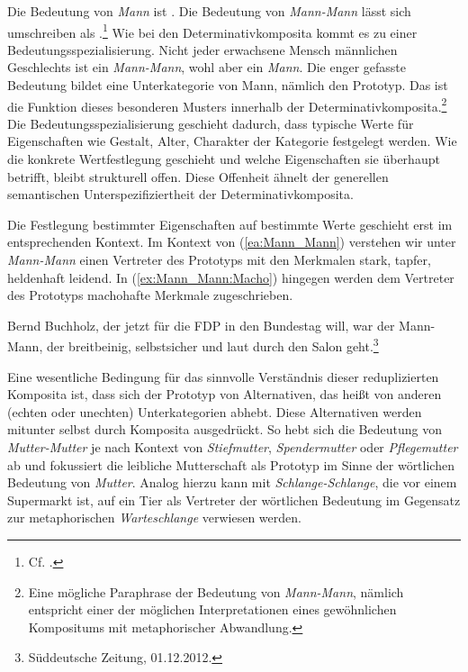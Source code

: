 Die Bedeutung von \textit{Mann} ist . Die Bedeutung von \textit{Mann-Mann} lässt sich umschreiben als .\footnote{Cf. \citet[312--314]{Hohenhaus2004}.} Wie bei den Determinativkomposita kommt es zu einer Bedeutungsspezialisierung. Nicht jeder erwachsene Mensch männlichen Geschlechts ist ein \textit{Mann-Mann}, wohl aber ein \textit{Mann}. Die enger gefasste Bedeutung bildet eine Unterkategorie von Mann, nämlich den Prototyp. Das ist die Funktion dieses besonderen Musters innerhalb der Determinativkomposita.\footnote{Eine mögliche Paraphrase der Bedeutung von \textit{Mann-Mann}, nämlich  entspricht einer der möglichen Interpretationen eines gewöhnlichen Kompositums mit metaphorischer Abwandlung.} Die Bedeutungsspezialisierung geschieht dadurch, dass typische Werte für Eigenschaften wie Gestalt, Alter, Charakter der Kategorie  festgelegt werden. Wie die konkrete Wertfestlegung geschieht und welche Eigenschaften sie überhaupt betrifft, bleibt strukturell offen. Diese Offenheit ähnelt der generellen semantischen Unterspezifiziertheit der Determinativkomposita.

Die Festlegung bestimmter Eigenschaften auf bestimmte Werte geschieht erst im entsprechenden Kontext. Im Kontext von (\ref{ea:Mann_Mann}) verstehen wir unter \textit{Mann-Mann} einen Vertreter des Prototyps mit den Merkmalen stark, tapfer, heldenhaft leidend. In (\ref{ex:Mann_Mann:Macho}) hingegen werden dem Vertreter des Prototyps machohafte Merkmale zugeschrieben.

\ea \label{ex:Mann_Mann:Macho} Bernd Buchholz, der jetzt für die FDP in den Bundestag will, war der Mann-Mann, der breitbeinig, selbstsicher und laut durch den Salon geht.\footnote{Süddeutsche Zeitung, 01.12.2012.}
\z 

Eine wesentliche Bedingung für das sinnvolle Verständnis dieser reduplizierten Komposita ist, dass sich der Prototyp von Alternativen, das heißt von anderen (echten oder unechten) Unterkategorien abhebt. Diese Alternativen werden mitunter selbst durch Komposita ausgedrückt. So hebt sich die Bedeutung von \textit{Mutter-Mutter} je nach Kontext von \textit{Stiefmutter}, \textit{Spendermutter} oder \textit{Pflegemutter} ab und fokussiert die leibliche Mutterschaft als Prototyp im Sinne der wörtlichen Bedeutung von \textit{Mutter}. Analog hierzu kann mit \textit{Schlange-Schlange}, die vor einem Supermarkt ist, auf ein Tier als Vertreter der wörtlichen Bedeutung im Gegensatz zur metaphorischen \textit{Warteschlange} verwiesen werden. 

